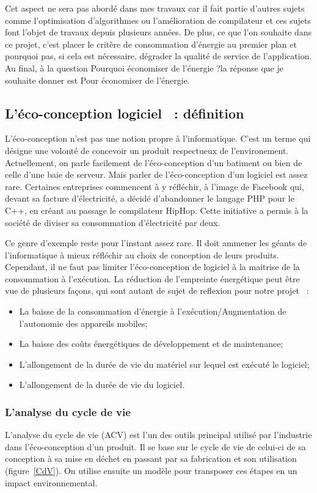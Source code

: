 \documentclass[a4paper, 11pt]{report}
\begin{document}
Cet aspect ne sera pas abordé dans mes travaux car il fait partie d'autres sujets comme l'optimisation d'algorithmes ou l'amélioration de compilateur et  ces sujets font l'objet de travaux depuis plusieurs années. De plus, ce que l'on souhaite dans ce projet, c'est placer le critère de consommation d'énergie au premier plan et pourquoi pas, si cela est nécessaire, dégrader la qualité de service de l'application. Au final, à la question \og Pourquoi économiser de l'énergie ?\fg la réponse que je souhaite donner est \og Pour économiser de l'énergie\fg.
		
		\subsection{L'éco-conception logiciel ~: définition}
L'éco-conception n'est pas une notion propre à l'informatique. C'est un terme qui désigne une volonté de concevoir un produit respectueux de l'environement. Actuellement, on parle facilement de l'éco-conception d'un batiment ou bien de celle d'une baie de serveur. Mais parler de l'éco-conception d'un logiciel est assez rare. Certaines entreprises commencent à y réfléchir, à l'image de Facebook qui, devant sa facture d'électricité, a décidé d'abandonner le langage PHP pour le C++, en créant au passage le compilateur HipHop. Cette initiative a permis à la société de diviser sa consommation d'électricité par deux.

Ce genre d'exemple reste pour l'instant assez rare. Il doit ammener les géants de l'informatique à mieux réfléchir au choix de conception de leurs produits. Cependant, il ne faut pas limiter l'éco-conception de logiciel à la maitrise de la consommation à l'exécution. La réduction de l’empreinte énergétique peut être vue de plusieurs façons, qui sont autant de sujet de reflexion pour notre projet ~:
\begin{itemize}
	\item La baisse de la consommation d’énergie à l'exécution/Augmentation de l’autonomie des appareils mobiles;
	\item La baisse des coûts énergétiques de développement et de maintenance;
	\item L'allongement de la durée de vie du matériel sur lequel est exécuté le logiciel;
	\item L'allongement de la durée de vie du logiciel.
\end{itemize}

			\subsubsection{L'analyse du cycle de vie}
L'analyse du cycle de vie (ACV) est l'un des outils principal utilisé par l'industrie dans l'éco-conception d'un produit. Il se base sur le cycle de vie de celui-ci de sa conception à sa mise en déchet en passant par sa fabrication et son utilisation (figure~\ref{CdV}). On utilise ensuite un modèle pour transposer ces étapes en un impact environnemental.
\end{document}
